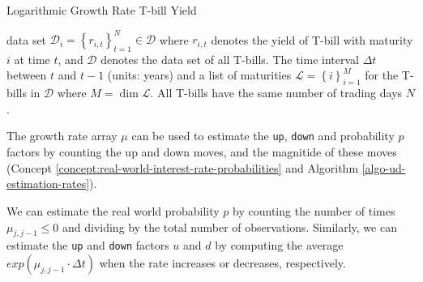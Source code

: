 \documentclass[11pt]{article}
\theoremstyle{definition}
\begin{document}
\begin{algorithm}[h]
    \caption{Logarithmic Growth Rate T-bill Yield}\label{algo-log-return-change-interest-rates}
    \begin{algorithmic}[1]

        \Statex
        \Require data set $\mathcal{D}_{i} = \left\{r_{i,t}\right\}_{t=1}^{N}\in\mathcal{D}$ where $r_{i,t}$ denotes the yield of T-bill with maturity $i$ at time $t$, 
		and $\mathcal{D}$ denotes the data set of all T-bills.
        \Require The time interval $\Delta{t}$ between $t$ and $t-1$ (units: years) and a list of maturities $\mathcal{L} = \left\{i\right\}_{i=1}^{M}$ for the T-bills in $\mathcal{D}$ where $M = \dim\mathcal{L}$.
		\Require All T-bills have the same number of trading days $N$.
     
        \Statex
            \EndFor
        \EndFor
        \Statex
		\EndProcedure
    \end{algorithmic}
\end{algorithm}
The growth rate array $\mu$ can be used to estimate the \texttt{up}, \texttt{down} and probability $p$ factors by counting the up and down moves, 
and the magnitide of these moves (Concept \ref{concept:real-world-interest-rate-probabilities} and Algorithm \ref{algo-ud-estimation-rates}).
\begin{concept}\label{concept:real-world-interest-rate-probabilities}
We can estimate the real world probability $p$ by counting the number of times $\mu_{j,j-1}\leq{0}$ and 
dividing by the total number of observations. Similarly, we can estimate the \texttt{up} and \texttt{down} factors $u$ and $d$ 
by computing the average $exp(\mu_{j,j-1}\cdot{\Delta{t}})$ when the rate increases or decreases, respectively.
\end{concept}
\end{document}
